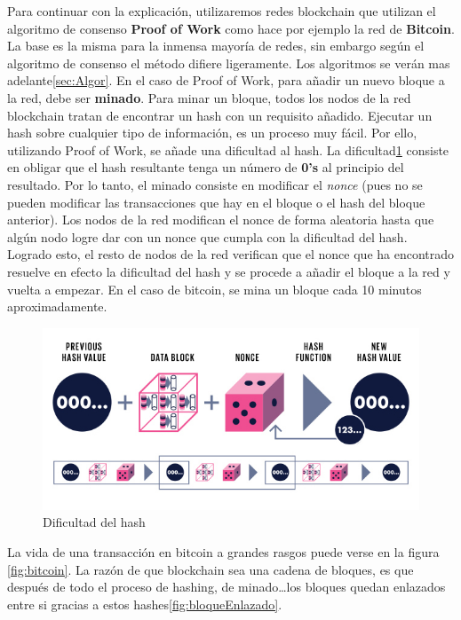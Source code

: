 Para continuar con la explicación, utilizaremos redes blockchain que utilizan el algoritmo de consenso \textbf{Proof of Work}\cite{whatIsProofOfWork} como hace por ejemplo la red de \textbf{Bitcoin}\cite{whatIsBitcoin}. La base es la misma para la inmensa mayoría de redes, sin embargo según el algoritmo de consenso el método difiere ligeramente. Los algoritmos se verán mas adelante\ref{sec:Algor}. En el caso de Proof of Work, para añadir un nuevo bloque a la red, debe ser \textbf{minado}\cite{minarBitcoin}. Para minar un bloque, todos los nodos de la red blockchain tratan de encontrar un hash con un requisito añadido. Ejecutar un hash sobre cualquier tipo de información, es un proceso muy fácil. Por ello, utilizando Proof of Work, se añade una dificultad al hash. La dificultad\ref{fig:hashDiff} consiste en obligar que el hash resultante tenga un número de \textbf{0's} al principio del resultado. Por lo tanto, el minado consiste en modificar el \emph{nonce} (pues no se pueden modificar las transacciones que hay en el bloque o el hash del bloque anterior). Los nodos de la red modifican el nonce de forma aleatoria hasta que algún nodo logre dar con un nonce que cumpla con la dificultad del hash. Logrado esto, el resto de nodos de la red verifican que el nonce que ha encontrado resuelve en efecto la dificultad del hash y se procede a añadir el bloque a la red y vuelta a empezar. En el caso de bitcoin, se mina un bloque cada 10 minutos aproximadamente. \\

\clearpage

\begin{figure}[h!]
  \centering
  \includegraphics[width=0.9\linewidth]{figs/EstadoArte/Blockchain/hashDificultad}
  \caption[Hash dificultad]{Dificultad del hash}
  \label{fig:hashDiff}
\end{figure}

La vida de una transacción en bitcoin a grandes rasgos puede verse en la figura \ref{fig:bitcoin}. La razón de que blockchain sea una cadena de bloques, es que después de todo el proceso de hashing, de minado\dots los bloques quedan enlazados entre si gracias a estos hashes\ref{fig:bloqueEnlazado}. 

